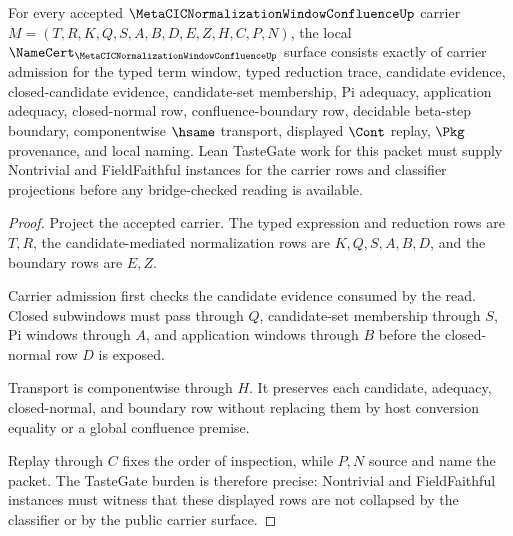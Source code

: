 \begin{theorem}
\label{thm:metacic-normalization-window-confluence-namecert-obligations}
For every accepted $\MetaCICNormalizationWindowConfluenceUp$ carrier $M=(T,R,K,Q,S,A,B,D,E,Z,H,C,P,N)$, the local $\NameCert_{\MetaCICNormalizationWindowConfluenceUp}$ surface consists exactly of carrier admission for the typed term window, typed reduction trace, candidate evidence, closed-candidate evidence, candidate-set membership, Pi adequacy, application adequacy, closed-normal row, confluence-boundary row, decidable beta-step boundary, componentwise $\hsame$ transport, displayed $\Cont$ replay, $\Pkg$ provenance, and local naming. Lean TasteGate work for this packet must supply Nontrivial and FieldFaithful instances for the carrier rows and classifier projections before any bridge-checked reading is available.
\end{theorem}
\begin{proof}
Project the accepted carrier. The typed expression and reduction rows are $T,R$, the candidate-mediated normalization rows are $K,Q,S,A,B,D$, and the boundary rows are $E,Z$.

Carrier admission first checks the candidate evidence consumed by the read. Closed subwindows must pass through $Q$, candidate-set membership through $S$, Pi windows through $A$, and application windows through $B$ before the closed-normal row $D$ is exposed.

Transport is componentwise through $H$. It preserves each candidate, adequacy, closed-normal, and boundary row without replacing them by host conversion equality or a global confluence premise.

Replay through $C$ fixes the order of inspection, while $P,N$ source and name the packet. The TasteGate burden is therefore precise: Nontrivial and FieldFaithful instances must witness that these displayed rows are not collapsed by the classifier or by the public carrier surface.
\end{proof}

